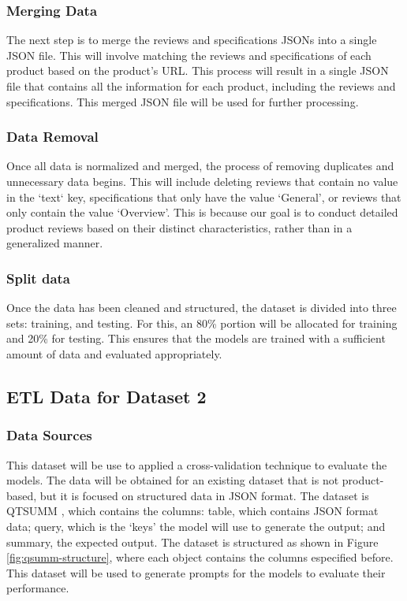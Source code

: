 \subsubsection{Merging Data}
The next step is to merge the reviews and specifications JSONs into a single JSON file. This will involve matching the reviews and specifications of each product based on the product's URL. This process will result in a single JSON file that contains all the information for each product, including the reviews and specifications. This merged JSON file will be used for further processing.

\subsubsection{Data Removal}
Once all data is normalized and merged, the process of removing duplicates and unnecessary data begins. This will include deleting reviews that contain no value in the `text` key, specifications that only have the value `General', or reviews that only contain the value `Overview'. This is because our goal is to conduct detailed product reviews based on their distinct characteristics, rather than in a generalized manner.

\subsubsection{Split data}
Once the data has been cleaned and structured, the dataset is divided into three sets: training, and testing. For this, an 80\% portion will be allocated for training and 20\% for testing. This ensures that the models are trained with a sufficient amount of data and evaluated appropriately.

\subsection{ETL Data for Dataset 2}
\subsubsection{Data Sources}
This dataset will be use to applied a cross-validation technique to evaluate the models. The data will be obtained for an existing dataset that is not product-based, but it is focused on structured data in JSON format. The dataset is QTSUMM \cite{zhao2023qtsummqueryfocusedsummarizationtabular}, which contains the columns: table, which contains JSON format data; query, which is the `keys' the model will use to generate the output; and summary, the expected output. The dataset is structured as shown in Figure \ref{fig:qsumm-structure}, where each object contains the columns especified before. This dataset will be used to generate prompts for the models to evaluate their performance.

